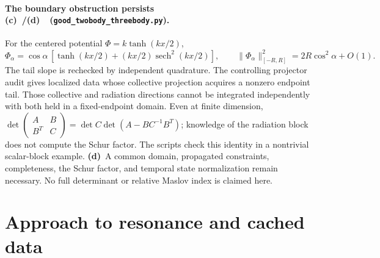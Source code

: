 \documentclass[11pt,a4paper]{article}
\newcommand{\Cc}{\textbf{(c)}\ }
\newcommand{\Cd}{\textbf{(d)}\ }
\newcommand{\file}[1]{\nolinkurl{#1}}
\newcommand{\three}{\file{good_twobody_threebody.py}}
\begin{document}
\paragraph{The boundary obstruction persists \Cc/\Cd\ (\three).}
For the centered potential \(\Phi=k\tanh(kx/2)\),
\begin{equation}
 \Phi_\alpha=\cos\alpha\,[\tanh(kx/2)+(kx/2)\operatorname{sech}^2(kx/2)],
 \qquad \|\Phi_\alpha\|_{[-R,R]}^2=2R\cos^2\alpha+O(1).
\end{equation}
The tail slope is rechecked by independent quadrature. The controlling
projector audit gives localized data whose collective projection acquires
a nonzero endpoint tail. Those collective and radiation directions cannot
be integrated independently with both held in a fixed-endpoint domain.
Even at finite dimension,
\(\det\left(\begin{smallmatrix}A&B\\B^T&C\end{smallmatrix}\right)
=\det C\det(A-BC^{-1}B^T)\); knowledge of the radiation block does not
compute the Schur factor. The scripts check this identity in a nontrivial
scalar-block example. \Cd A common domain, propagated constraints,
completeness, the Schur factor, and temporal state normalization remain
necessary. No full determinant or relative Maslov index is claimed here.

\section{Approach to resonance and cached data}
\end{document}
